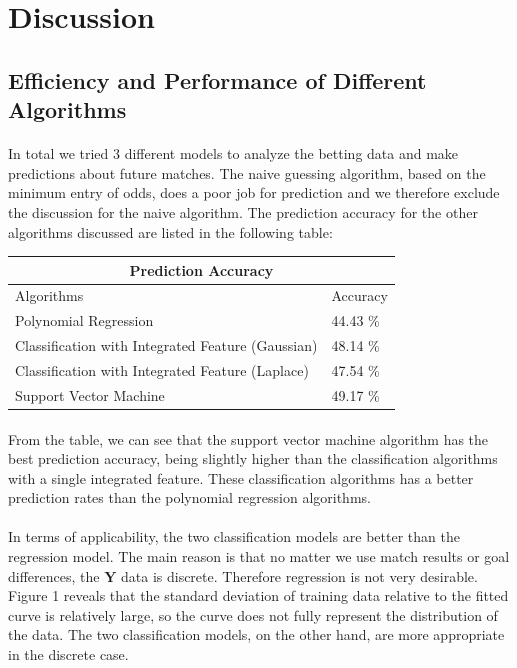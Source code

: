 \documentclass[12pt]{article}
\begin{document}
\section{Discussion}
\subsection{Efficiency and Performance of Different Algorithms}

\paragraph{}
In total we tried 3 different models to analyze the betting data and make predictions about future matches. The naive guessing algorithm, based on the minimum entry of odds, does a poor job for prediction and we therefore exclude the discussion for the naive algorithm. The prediction accuracy for the other algorithms discussed are listed in the following table:
\newline
\begin{tabular}{ |p{9cm}|p{2cm}|  }
	\hline
	\multicolumn{2}{|c|}{Prediction Accuracy} \\
	\hline
	Algorithms & Accuracy \\
	\hline
	Polynomial Regression & 44.43 \% \\ 
	Classification with Integrated Feature (Gaussian) & 48.14 \% \\
	Classification with Integrated Feature (Laplace) & 47.54 \% \\
	Support Vector Machine & 49.17 \% \\
	\hline
\end{tabular}
\paragraph{}
From the table, we can see that the support vector machine algorithm has the best prediction accuracy, being slightly higher than the classification algorithms with a single integrated feature. These classification algorithms has a better prediction rates than the polynomial regression algorithms.

\paragraph{}
In terms of applicability, the two classification models are better than the regression model. The main reason is that no matter we use match results or goal differences, the $\mathbf{Y}$ data is discrete. Therefore regression is not very desirable. Figure 1 reveals that the standard deviation of training data relative to the fitted curve is relatively large, so the curve does not fully represent the distribution of the data. The two classification models, on the other hand, are more appropriate in the discrete case.
\end{document}
